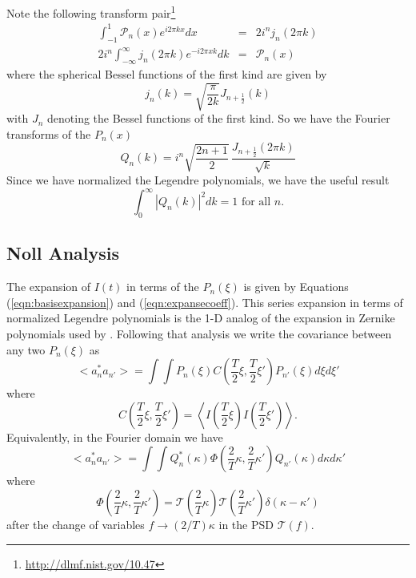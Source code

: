 \documentclass[11pt,preprint]{aastex}
\begin{document}
Note the following transform pair\footnote{\url{http://dlmf.nist.gov/10.47}}
\begin{eqnarray}
\int_{-1}^{1} \mathscr{P}_n(x) e^{i2\pi k x} dx & = & 2 i^n j_n(2\pi k)\\
2 i^n \int_{-\infty}^{\infty} j_n(2\pi k) e^{-i2\pi x k} dk &=& \mathscr{P}_n(x)
\end{eqnarray}
where the spherical Bessel functions of the first kind are given by
\begin{equation}
j_n(k) = \sqrt{\frac{\pi}{2k}}J_{n+\frac{1}{2}}(k)
\end{equation}
with $J_n$ denoting the Bessel functions of the first kind.  So we have the Fourier transforms of the $P_n(x)$ 
\begin{equation}
Q_n(k) = i^n \sqrt{\frac{2n+1}{2}}\, \frac{J_{n+\frac{1}{2}}(2\pi k)}{\sqrt{k}}
\end{equation}
Since we have normalized the Legendre polynomials, we have the useful result
\begin{equation}
\int_0^\infty \left| Q_n(k) \right|^2 dk = 1 \mbox{ for all }n.
\end{equation}

\subsection{Noll Analysis}

The expansion of $I(t)$ in terms of the $P_n(\xi)$ is given by Equations (\ref{eqn:basisexpansion}) and (\ref{eqn:expansecoeff}).  This series expansion in terms of normalized Legendre polynomials is the 1-D analog of the expansion in Zernike polynomials used by \citet{1976JOSA...66..207N}.  Following that analysis we write the covariance between any two $P_n(\xi)$ as
\begin{equation}
<a_n^* a_{n'}> = \int \int P_n(\xi) C\left(\frac{T}{2}\xi, \frac{T}{2}\xi' \right) P_{n'}(\xi) d\xi d\xi' 
\end{equation}
where
\begin{equation}
C\left(\frac{T}{2}\xi, \frac{T}{2}\xi' \right) = \left<I\left(\frac{T}{2}\xi\right)I\left(\frac{T}{2}\xi'\right) \right>.
\end{equation}
Equivalently, in the Fourier domain we have
\begin{equation}
<a_n^* a_{n'}> = \int \int Q_n^*(\kappa) \Phi \left(\frac{2}{T}\kappa, \frac{2}{T}\kappa' \right) Q_{n'}(\kappa) d\kappa d\kappa' 
\end{equation}
where
\begin{equation}
\Phi \left(\frac{2}{T}\kappa, \frac{2}{T}\kappa' \right) =  \mathcal{T}\left(\frac{2}{T}\kappa \right) \mathcal{T}\left(\frac{2}{T} \kappa' \right) \delta(\kappa-\kappa')
\end{equation}
after the change of variables $f \rightarrow (2/T)\kappa$ in the PSD $\mathcal{T}(f)$.
\end{document}
